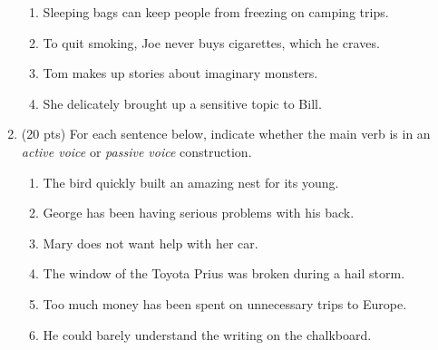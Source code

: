 \documentclass[11pt]{article}
\begin{document}
\begin{enumerate}
\begin{enumerate}
\item Sleeping bags can keep people from freezing on camping trips.
\vspace*{.2in}


\item To quit smoking, Joe never buys cigarettes, which he craves.
\vspace*{.2in}


\item  Tom makes up stories about imaginary monsters.
\vspace*{.2in}



\item She delicately brought up a sensitive topic to Bill.
\vspace*{.2in}


\end{enumerate}


\newpage

\item (20 pts) For each sentence below, indicate whether the main verb
  is in an {\it active voice} or {\it passive voice} construction. 

\begin{enumerate}

\item The bird quickly built an amazing nest for its young.
\vspace*{.5in}

\item George has been having serious problems with his back.
\vspace*{.5in}

\item Mary does not want help with her car.
\vspace*{.5in}

\item The window of the Toyota Prius was broken during a hail storm.
\vspace*{.5in}

\item Too much money has been spent on unnecessary trips to Europe.
\vspace*{.5in}

\item He could barely understand the writing on the chalkboard.
\vspace*{.5in}


\end{enumerate}
\end{enumerate}
\end{document}
